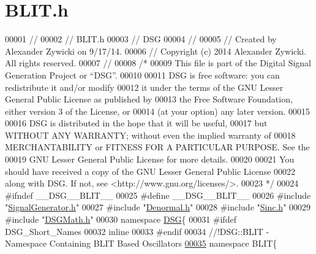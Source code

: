 \hypertarget{_b_l_i_t_8h_source}{\section{B\+L\+I\+T.\+h}
\label{_b_l_i_t_8h_source}
}

\begin{DoxyCode}
00001 \textcolor{comment}{//}
00002 \textcolor{comment}{//  BLIT.h}
00003 \textcolor{comment}{//  DSG}
00004 \textcolor{comment}{//}
00005 \textcolor{comment}{//  Created by Alexander Zywicki on 9/17/14.}
00006 \textcolor{comment}{//  Copyright (c) 2014 Alexander Zywicki. All rights reserved.}
00007 \textcolor{comment}{//}
00008 \textcolor{comment}{/*}
00009 \textcolor{comment}{ This file is part of the Digital Signal Generation Project or “DSG”.}
00010 \textcolor{comment}{}
00011 \textcolor{comment}{ DSG is free software: you can redistribute it and/or modify}
00012 \textcolor{comment}{ it under the terms of the GNU Lesser General Public License as published by}
00013 \textcolor{comment}{ the Free Software Foundation, either version 3 of the License, or}
00014 \textcolor{comment}{ (at your option) any later version.}
00015 \textcolor{comment}{}
00016 \textcolor{comment}{ DSG is distributed in the hope that it will be useful,}
00017 \textcolor{comment}{ but WITHOUT ANY WARRANTY; without even the implied warranty of}
00018 \textcolor{comment}{ MERCHANTABILITY or FITNESS FOR A PARTICULAR PURPOSE.  See the}
00019 \textcolor{comment}{ GNU Lesser General Public License for more details.}
00020 \textcolor{comment}{}
00021 \textcolor{comment}{ You should have received a copy of the GNU Lesser General Public License}
00022 \textcolor{comment}{ along with DSG.  If not, see <http://www.gnu.org/licenses/>.}
00023 \textcolor{comment}{ */}
00024 \textcolor{preprocessor}{#ifndef \_\_DSG\_\_BLIT\_\_}
00025 \textcolor{preprocessor}{#define \_\_DSG\_\_BLIT\_\_}
00026 \textcolor{preprocessor}{#include "\hyperlink{_signal_generator_8h}{SignalGenerator.h}"}
00027 \textcolor{preprocessor}{#include "\hyperlink{_denormal_8h}{Denormal.h}"}
00028 \textcolor{preprocessor}{#include "\hyperlink{_sinc_8h}{Sinc.h}"}
00029 \textcolor{preprocessor}{#include "\hyperlink{_d_s_g_math_8h}{DSGMath.h}"}
00030 \textcolor{keyword}{namespace }\hyperlink{namespace_d_s_g}{DSG}\{
00031 \textcolor{preprocessor}{#ifdef DSG\_Short\_Names}
00032     \textcolor{keyword}{inline}
00033 \textcolor{preprocessor}{#endif}
00034 \textcolor{comment}{    //!DSG::BLIT - Namespace Containing BLIT Based Oscillators}
\hypertarget{_b_l_i_t_8h_source_l00035}{}\hyperlink{namespace_d_s_g_1_1_b_l_i_t}{00035} \textcolor{comment}{}    \textcolor{keyword}{namespace }BLIT\{\textcolor{comment}{}

\end{DoxyCode}
